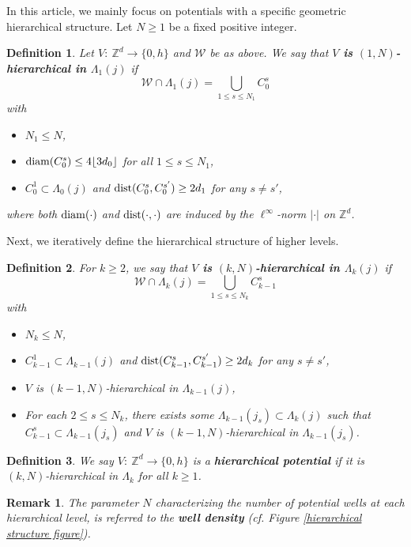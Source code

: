 \documentclass[11pt,reqno,UTF8,twoside]{amsart}
\newcommand{\Z}{\mathbb{Z}}
\newcommand{\mcW}{\mathcal{W}}
\newcommand{\dist}{{\rm dist}}
\newcommand{\diam}{{\rm diam}}
\newtheorem{Def}{Definition}[section]
\newtheorem{rmk}{\bf Remark}[section]
\theoremstyle{definition}
\numberwithin{equation}{section}
\begin{document}
In this article,  we  mainly  focus on  potentials with a specific geometric hierarchical structure.  Let $N\geq 1$ be a fixed positive integer. 
\begin{Def}\label{1-hierarchical structure}
Let $V:\ \Z^d\to \{0,h\}$ and $\mathcal W$ be as above. We say that \textbf{$V$ is $(1,N)$-hierarchical in  $\Lambda_1(j)$} if %
\[
\mcW \cap \Lambda_1(j)= \bigcup_{1\leq s \leq N_1} C^s_0
\]
with   %
\begin{itemize}
    \item $N_1\leq N$,
    \item $\diam(C_0^s)\leq 4 \lfloor 3d_0 \rfloor$ for all $1\leq s\leq N_1$,
    \item $C_0^1 \subset \Lambda_0(j)$ and $\dist(C_0^s,C_0^{s'})\geq 2 d_1$ for any $s\neq s'$,
\end{itemize}
where both $\diam(\cdot)$ and $\dist(\cdot, \cdot)$ are induced by the $\ell^\infty$-norm $|\cdot|$ on $\Z^d$. 
\end{Def}
Next, we iteratively define the hierarchical structure of higher levels.
\begin{Def}\label{k-hierarchical structure}
For $k\geq 2$, we say that \textbf{$V$ is $(k,N)$-hierarchical in $\Lambda_k(j)$} if %
\[
\mcW \cap \Lambda_k(j)= \bigcup_{1\leq s \leq N_k} C^s_{k-1}
\]
with  %
\begin{itemize}
    \item $N_k\leq N$,
    \item $C_{k-1}^1 \subset \Lambda_{k-1}(j)$ and $\dist(C_{k-1}^s,C_{k-1}^{s'})\geq 2 d_{k}$ for any $s\neq s'$,
    \item $V$ is $(k-1,N)$-hierarchical in  $\Lambda_{k-1}(j)$,
    \item For each $2\leq s\leq N_{k}$, there exists  some  $\Lambda_{k-1}(j_s)\subset \Lambda_k(j)$ such that $C_{k-1}^s\subset \Lambda_{k-1}(j_s)$ and $V$ is $(k-1,N)$-hierarchical in  $\Lambda_{k-1}(j_s)$.
\end{itemize}
\end{Def}
\begin{Def}
We say  $V:\ \Z^d\to\{0,h\}$ is a \textbf{hierarchical potential} if it is $(k,N)$-hierarchical in $\Lambda_k$ for all $k\geq 1$.
\end{Def}
\begin{rmk}
The parameter $N$  characterizing  the number of potential wells at each hierarchical level, is referred to   the \textbf{well density} (cf. Figure \ref{hierarchical structure figure}).
\end{rmk}
\end{document}
